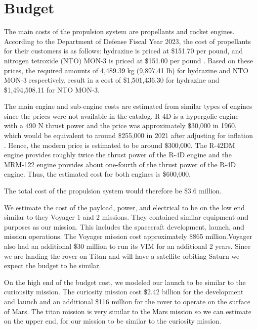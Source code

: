 \documentclass[conf]{new-aiaa}
\begin{document}
{\section{Budget}
\par The main costs of the propulsion system are propellants and rocket engines. According to the Department of Defense Fiscal Year 2023, the cost of propellants for their customers is as follows: hydrazine is priced at \$151.70 per pound, and nitrogen tetroxide (NTO) MON-3 is priced at \$151.00 per pound \cite{sninsky_2022}. Based on these prices, the required amounts of 4,489.39 kg (9,897.41 lb) for hydrazine and NTO MON-3 respectively, result in a cost of \$1,501,436.30 for hydrazine and \$1,494,508.11 for NTO MON-3.\\
\par The main engine and sub-engine costs are estimated from similar types of engines since the prices were not available in the catalog. R-4D is a hypergolic engine with a 490 N thrust power and the price was approximately \$30,000 in 1960, which would be equivalent to around \$255,000 in 2021 after adjusting for inflation \cite{fisher_rahman_2009}. Hence, the modern price is estimated to be around \$300,000. The R-42DM engine provides roughly twice the thrust power of the R-4D engine and the MRM-122 engine provides about one-fourth of the thrust power of the R-4D engine. Thus, the estimated cost for both engines is \$600,000.\\
\par The total cost of the propulsion system would therefore be \$3.6 million.\\

\par We estimate the cost of the payload, power, and electrical to be on the low end similar to they Voyager 1 and 2 missions.  They contained similar equipment and purposes as our mission.  This includes the spacecraft development, launch, and mission operations.  The Voyager mission cost approximately \$865 million.Voyager also had an additional \$30 million to run its VIM for an additional 2 years. \cite{Voyager}
 Since we are landing the rover on Titan and will have a satellite orbiting Saturn we expect the budget to be similar.\\  
 \par On the high end of the budget cost, we modeled our launch to be similar to the curiousity mission.  The curiosity mission cost \$2.42 billion for the development and launch and an additional \$116 million for the rover to operate on the surface of Mars.  The titan mission is very similar to the Mars mission so we can estimate on the upper end, for our mission to be similar to the curiosity mission. \cite{Curiosity}


}
\end{document}
